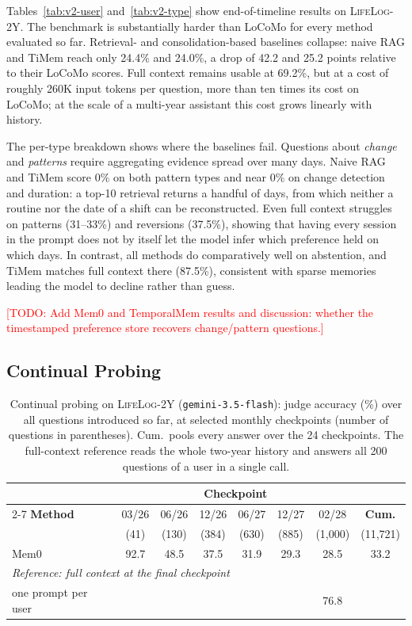 \documentclass[11pt]{article}
\newcommand{\ours}{TemporalMem}
\newcommand{\dataset}{\textsc{LifeLog-2Y}}
\newcommand{\todo}[1]{\textcolor{red}{[TODO: #1]}}
\begin{document}
Tables~\ref{tab:v2-user} and~\ref{tab:v2-type} show end-of-timeline results on \dataset. The benchmark is substantially harder than LoCoMo for every method evaluated so far. Retrieval- and consolidation-based baselines collapse: naive RAG and TiMem reach only 24.4\% and 24.0\%, a drop of 42.2 and 25.2 points relative to their LoCoMo scores. Full context remains usable at 69.2\%, but at a cost of roughly 260K input tokens per question, more than ten times its cost on LoCoMo; at the scale of a multi-year assistant this cost grows linearly with history.

The per-type breakdown shows where the baselines fail. Questions about \emph{change} and \emph{patterns} require aggregating evidence spread over many days. Naive RAG and TiMem score 0\% on both pattern types and near 0\% on change detection and duration: a top-10 retrieval returns a handful of days, from which neither a routine nor the date of a shift can be reconstructed. Even full context struggles on patterns (31--33\%) and reversions (37.5\%), showing that having every session in the prompt does not by itself let the model infer which preference held on which days. In contrast, all methods do comparatively well on abstention, and TiMem matches full context there (87.5\%), consistent with sparse memories leading the model to decline rather than guess.

\todo{Add Mem0 and \ours{} results and discussion: whether the timestamped preference store recovers change/pattern questions.}

\subsection{Continual Probing}

\begin{table}[t]
  \centering
  \small
  \setlength{\tabcolsep}{3.5pt}
  \begin{tabular}{lccccccc}
    \toprule
     & \multicolumn{6}{c}{\textbf{Checkpoint}} & \\
    \cmidrule(lr){2-7}
    \textbf{Method} & 03/26 & 06/26 & 12/26 & 06/27 & 12/27 & 02/28 & \textbf{Cum.} \\
     & (41) & (130) & (384) & (630) & (885) & (1{,}000) & (11{,}721) \\
    \midrule
    Mem0 & 92.7 & 48.5 & 37.5 & 31.9 & 29.3 & 28.5 & 33.2 \\
    \midrule
    \multicolumn{8}{l}{\textit{Reference: full context at the final checkpoint}} \\
    \quad one prompt per user & & & & & & 76.8 & \\
    \bottomrule
  \end{tabular}
  \caption{Continual probing on \dataset{} (\texttt{gemini-3.5-flash}): judge accuracy (\%) over all questions introduced so far, at selected monthly checkpoints (number of questions in parentheses). Cum.\ pools every answer over the 24 checkpoints. The full-context reference reads the whole two-year history and answers all 200 questions of a user in a single call.}
  \label{tab:continual}
\end{table}
\end{document}
